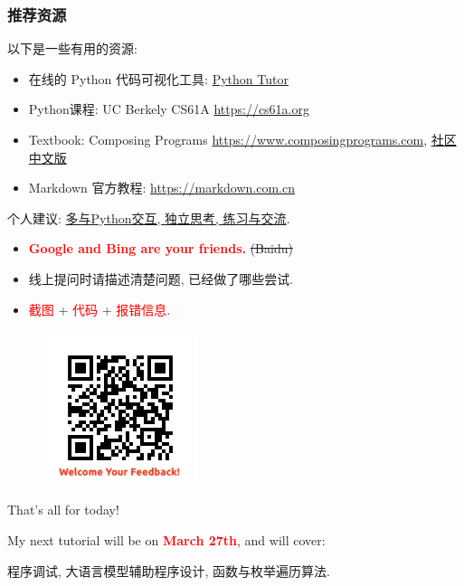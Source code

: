 \documentclass{ctexbeamer}
\begin{document}
        \begin{frame}
            \frametitle{推荐资源}   
            以下是一些有用的资源:
            \begin{itemize}
                \item 在线的 Python 代码可视化工具: \href{https://pythontutor.com/python-compiler.html}{Python Tutor}
                \item Python课程: UC Berkely CS61A \href{https://cs61a.org}{https://cs61a.org}
                \item Textbook: Composing Programs \href{https://www.composingprograms.com}{https://www.composingprograms.com}, \href{https://composingprograms.netlify.app}{社区中文版}            
                \item Markdown 官方教程: \href{https://markdown.com.cn}{https://markdown.com.cn}
            \end{itemize}
            \vspace{1em}
            个人建议: \underline{多与Python交互, 独立思考, 练习与交流}.

            \begin{itemize}
                \item \textcolor{red}{\textbf{Google and Bing are your friends.}} \sout{(Baidu)}
                \item 线上提问时请描述清楚问题, 已经做了哪些尝试. 
                \item \textcolor{red}{截图} + \textcolor{red}{代码} + \textcolor{red}{报错信息}.
            \end{itemize}
        \end{frame}
    
    \begin{frame}
        \begin{figure}
            \centering
            \includegraphics[width=0.4\textwidth]{./images/qrcode.jpg}
        \end{figure}
        \begin{center}
            \Large That's all for today!
        \end{center}
        \begin{center}
            My next tutorial will be on \textcolor{red}{\textbf{March 27th}}, and will cover:

            \vspace{1em}
            程序调试, 大语言模型辅助程序设计, 函数与枚举遍历算法.
        \end{center}
    \end{frame}
\end{document}
